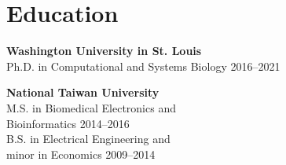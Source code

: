 \section{Education}

\begin{outerlist}

\item \textbf{Washington University in St. Louis} \\
    Ph.D. in Computational and Systems Biology \hfill
	2016--2021

\item \textbf{National Taiwan University} \\
	M.S. in Biomedical Electronics and \\
    Bioinformatics \hfill 2014--2016 \\
	B.S. in Electrical Engineering and \\
    minor in Economics \hfill 2009--2014
\end{outerlist}
